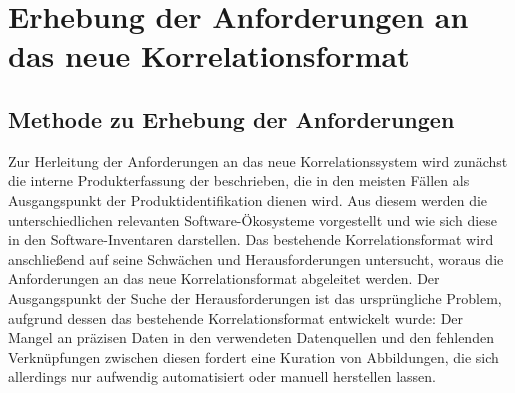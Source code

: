 \chapter{Erhebung der Anforderungen an das neue Korrelationsformat}\label{ch:anforderungen}


\section{Methode zu Erhebung der Anforderungen}

Zur Herleitung der Anforderungen an das neue Korrelationssystem wird zunächst die interne Produkterfassung der \metaeffektsp beschrieben, die in den meisten Fällen als Ausgangspunkt der Produktidentifikation dienen wird.
Aus diesem werden die unterschiedlichen relevanten Software-Ökosysteme vorgestellt und wie sich diese in den Software-Inventaren darstellen.
Das bestehende Korrelationsformat wird anschließend auf seine Schwächen und Herausforderungen untersucht, woraus die Anforderungen an das neue Korrelationsformat abgeleitet werden.
Der Ausgangspunkt der Suche der Herausforderungen ist das ursprüngliche Problem, aufgrund dessen das bestehende Korrelationsformat entwickelt wurde:
Der Mangel an präzisen Daten in den verwendeten Datenquellen und den fehlenden Verknüpfungen zwischen diesen fordert eine Kuration von Abbildungen, die sich allerdings nur aufwendig automatisiert oder manuell herstellen lassen.











